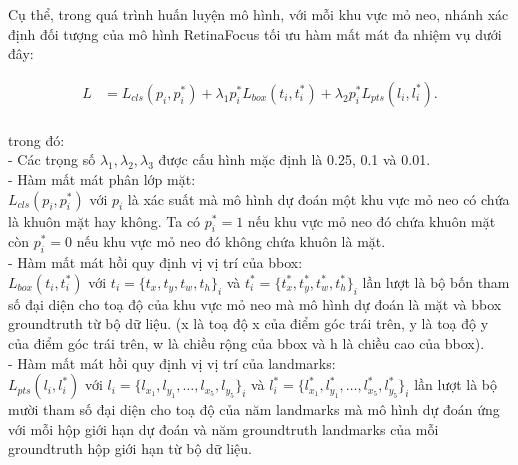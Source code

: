 {    \noindent
    Cụ thể, trong quá trình huấn luyện mô hình, với mỗi khu vực mỏ neo, nhánh xác định đối tượng của mô hình RetinaFocus tối ưu hàm mất mát đa nhiệm vụ dưới đây:

    \begin{equation}
        \begin{split}
        L  & =  L_{cls}(p_i, p^{*}_i) + \lambda_1 p^{*}_i L_{box}(t_i, t^{*}_i) + \lambda_2 p^{*}_i L_{pts} (l_i, l^{*}_i).\\
        \end{split}
        \label{eq:retinaface_loss}
    \end{equation}

    \noindent
    trong đó: \\
    - Các trọng số $\lambda_1, \lambda_2, \lambda_3$ được cấu hình mặc định là 0.25, 0.1 và 0.01. \\
    - Hàm mất mát phân lớp mặt: \\
    $L_{cls}(p_i, p^{*}_i)$ với $p_i$ là xác suất mà mô hình dự đoán một khu vực mỏ neo có chứa là khuôn mặt hay không.
    Ta có $p^{*}_i = 1$ nếu khu vực mỏ neo đó chứa khuôn mặt còn $p^{*}_i = 0$ nếu khu vực mỏ neo đó không chứa khuôn là mặt. \\
    - Hàm mất mát hồi quy định vị vị trí của bbox: \\
    $L_{box}(t_i, t^{*}_i)$ với $t_i=\{t_x, t_y, t_w, t_h\}_i$ và $t^{*}_i=\{t^{*}_x, t^{*}_y, t^{*}_w, t^{*}_h\}_i$ lần lượt là bộ bốn tham số đại diện cho toạ độ của khu vực mỏ neo mà mô hình dự đoán là mặt và bbox groundtruth từ bộ dữ liệu.
    (x là toạ độ x của điểm góc trái trên, y là toạ độ y của điểm góc trái trên, w là chiều rộng của bbox và h là chiều cao của bbox). \\
    - Hàm mất mát hồi quy định vị vị trí của landmarks: \\
    $L_{pts} (l_i, l^{*}_i)$ với $l_i=\{l_{x_1}, l_{y_1}, \dots , l_{x_5}, l_{y_5}\}_i$ và $l^{*}_i=\{l^{*}_{x_1}, l^{*}_{y_1}, \dots , l^{*}_{x_5}, l^{*}_{y_5}\}_i$ lần lượt là bộ mười tham số đại diện cho toạ độ của năm landmarks mà mô hình dự đoán ứng với mỗi hộp giới hạn dự đoán và năm groundtruth landmarks của mỗi groundtruth hộp giới hạn từ bộ dữ liệu.
}